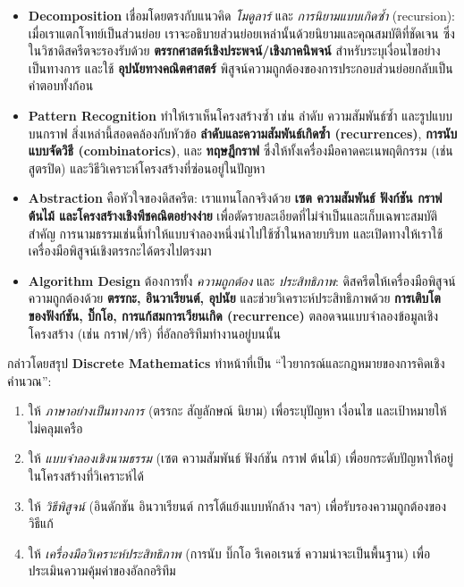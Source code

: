 \begin{itemize}
	\item \textbf{Decomposition} เชื่อมโดยตรงกับแนวคิด \textit{โมดูลาร์} และ \textit{การนิยามแบบเกิดซ้ำ} (recursion): เมื่อเราแตกโจทย์เป็นส่วนย่อย เราจะอธิบายส่วนย่อยเหล่านั้นด้วยนิยามและคุณสมบัติที่ชัดเจน ซึ่งในวิชาดิสครีตจะรองรับด้วย \textbf{ตรรกศาสตร์เชิงประพจน์/เชิงภาคนิพจน์} สำหรับระบุเงื่อนไขอย่างเป็นทางการ และใช้ \textbf{อุปนัยทางคณิตศาสตร์} พิสูจน์ความถูกต้องของการประกอบส่วนย่อยกลับเป็นคำตอบทั้งก้อน
	\item \textbf{Pattern Recognition} ทำให้เราเห็นโครงสร้างซ้ำ เช่น ลำดับ ความสัมพันธ์ซ้ำ และรูปแบบบนกราฟ สิ่งเหล่านี้สอดคล้องกับหัวข้อ \textbf{ลำดับและความสัมพันธ์เกิดซ้ำ (recurrences)}, \textbf{การนับแบบจัดวิธี (combinatorics)}, และ \textbf{ทฤษฎีกราฟ} ซึ่งให้ทั้งเครื่องมือคาดคะเนพฤติกรรม (เช่น สูตรปิด) และวิธีวิเคราะห์โครงสร้างที่ซ่อนอยู่ในปัญหา
	\item \textbf{Abstraction} คือหัวใจของดิสครีต: เราแทนโลกจริงด้วย \textbf{เซต ความสัมพันธ์ ฟังก์ชัน กราฟ ต้นไม้ และโครงสร้างเชิงพีชคณิตอย่างง่าย} เพื่อตัดรายละเอียดที่ไม่จำเป็นและเก็บเฉพาะสมบัติสำคัญ การนามธรรมเช่นนี้ทำให้แบบจำลองหนึ่งนำไปใช้ซ้ำในหลายบริบท และเปิดทางให้เราใช้เครื่องมือพิสูจน์เชิงตรรกะได้ตรงไปตรงมา
	\item \textbf{Algorithm Design} ต้องการทั้ง \textit{ความถูกต้อง} และ \textit{ประสิทธิภาพ}: ดิสครีตให้เครื่องมือพิสูจน์ความถูกต้องด้วย \textbf{ตรรกะ, อินวาเรียนต์, อุปนัย} และช่วยวิเคราะห์ประสิทธิภาพด้วย \textbf{การเติบโตของฟังก์ชัน, บิ๊กโอ, การแก้สมการเวียนเกิด (recurrence)} ตลอดจนแบบจำลองข้อมูลเชิงโครงสร้าง (เช่น กราฟ/ทรี) ที่อัลกอริทึมทำงานอยู่บนนั้น
\end{itemize}

กล่าวโดยสรุป \textbf{Discrete Mathematics} ทำหน้าที่เป็น “ไวยากรณ์และกฎหมายของการคิดเชิงคำนวณ”: 
\begin{enumerate}
	\item ให้ \textit{ภาษาอย่างเป็นทางการ} (ตรรกะ สัญลักษณ์ นิยาม) เพื่อระบุปัญหา เงื่อนไข และเป้าหมายให้ไม่คลุมเครือ
	\item ให้ \textit{แบบจำลองเชิงนามธรรม} (เซต ความสัมพันธ์ ฟังก์ชัน กราฟ ต้นไม้) เพื่อยกระดับปัญหาให้อยู่ในโครงสร้างที่วิเคราะห์ได้
	\item ให้ \textit{วิธีพิสูจน์} (อินดักชัน อินวาเรียนต์ การโต้แย้งแบบหักล้าง ฯลฯ) เพื่อรับรองความถูกต้องของวิธีแก้
	\item ให้ \textit{เครื่องมือวิเคราะห์ประสิทธิภาพ} (การนับ บิ๊กโอ รีเคอเรนซ์ ความน่าจะเป็นพื้นฐาน) เพื่อประเมินความคุ้มค่าของอัลกอริทึม
\end{enumerate}

